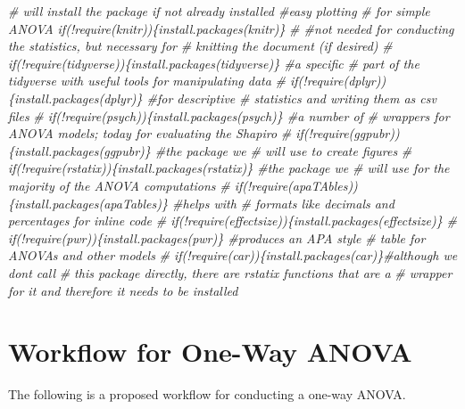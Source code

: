 \documentclass[
  11pt,
]{book}
\newenvironment{Shaded}{\begin{snugshade}}{\end{snugshade}}
\newcommand{\CommentTok}[1]{\textcolor[rgb]{0.37,0.37,0.37}{\textit{#1}}}
\begin{document}
\begin{Shaded}
\begin{Highlighting}[]
\CommentTok{\# will install the package if not already installed \#easy plotting}
\CommentTok{\# for simple ANOVA if(!require(knitr))\{install.packages(\textquotesingle{}knitr\textquotesingle{})\}}
\CommentTok{\# \#not needed for conducting the statistics, but necessary for}
\CommentTok{\# knitting the document (if desired)}
\CommentTok{\# if(!require(tidyverse))\{install.packages(\textquotesingle{}tidyverse\textquotesingle{})\} \#a specific}
\CommentTok{\# part of the tidyverse with useful tools for manipulating data}
\CommentTok{\# if(!require(dplyr))\{install.packages(\textquotesingle{}dplyr\textquotesingle{})\} \#for descriptive}
\CommentTok{\# statistics and writing them as csv files}
\CommentTok{\# if(!require(psych))\{install.packages(\textquotesingle{}psych\textquotesingle{})\} \#a number of}
\CommentTok{\# wrappers for ANOVA models; today for evaluating the Shapiro}
\CommentTok{\# if(!require(ggpubr))\{install.packages(\textquotesingle{}ggpubr\textquotesingle{})\} \#the package we}
\CommentTok{\# will use to create figures}
\CommentTok{\# if(!require(rstatix))\{install.packages(\textquotesingle{}rstatix\textquotesingle{})\} \#the package we}
\CommentTok{\# will use for the majority of the ANOVA computations}
\CommentTok{\# if(!require(apaTAbles))\{install.packages(\textquotesingle{}apaTables\textquotesingle{})\} \#helps with}
\CommentTok{\# formats like decimals and percentages for inline code}
\CommentTok{\# if(!require(effectsize))\{install.packages(\textquotesingle{}effectsize\textquotesingle{})\}}
\CommentTok{\# if(!require(pwr))\{install.packages(\textquotesingle{}pwr\textquotesingle{})\} \#produces an APA style}
\CommentTok{\# table for ANOVAs and other models}
\CommentTok{\# if(!require(car))\{install.packages(\textquotesingle{}car\textquotesingle{})\}\#although we don\textquotesingle{}t call}
\CommentTok{\# this package directly, there are rstatix functions that are a}
\CommentTok{\# wrapper for it and therefore it needs to be installed}
\end{Highlighting}
\end{Shaded}

\hypertarget{workflow-for-one-way-anova}{%
\section{Workflow for One-Way ANOVA}\label{workflow-for-one-way-anova}}

The following is a proposed workflow for conducting a one-way ANOVA.
\end{document}
